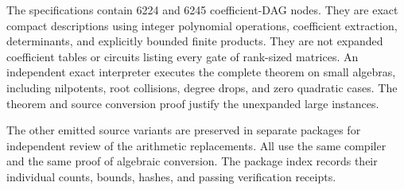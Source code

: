 The specifications contain 6224 and 6245 coefficient-DAG nodes.
They are exact compact descriptions using integer polynomial
operations, coefficient extraction, determinants, and explicitly
bounded finite products.  They are not expanded coefficient
tables or circuits listing every gate of rank-sized matrices.
An independent exact interpreter executes the complete theorem
on small algebras, including nilpotents, root collisions, degree
drops, and zero quadratic cases.  The theorem and source conversion
proof justify the unexpanded large instances.

The other emitted source variants are preserved in separate
packages for independent review of the arithmetic replacements.
All use the same compiler and the same proof of algebraic
conversion.  The package index records their individual counts,
bounds, hashes, and passing verification receipts.
